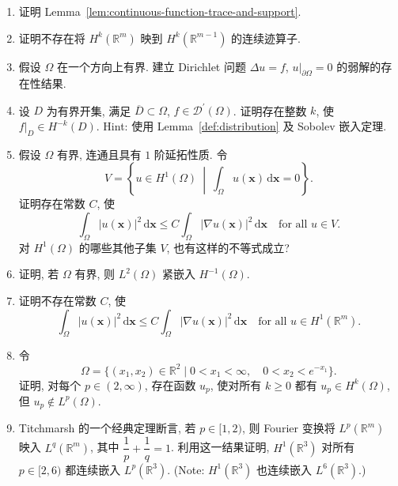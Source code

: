 \begin{enumerate}[label=\thesection.\arabic*.,ref=\thesection.\arabic*,start=1,series=book-problems]
\item\label{ex:continuous-function-trace-support-lemma-proof} 证明 Lemma~\ref{lem:continuous-function-trace-and-support}.

\item\label{ex:trace-without-half-order-loss-impossible} 证明不存在将 $H^k(\mathbb{R}^m)$ 映到 $H^k(\mathbb{R}^{m-1})$ 的连续迹算子.

\item\label{ex:one-direction-bounded-domain-weak-dirichlet-existence} 假设 $\Omega$ 在一个方向上有界. 建立 Dirichlet 问题 $\Delta u=f$, $u|_{\partial\Omega}=0$ 的弱解的存在性结果.

\item\label{ex:distribution-local-negative-sobolev-order} 设 $D$ 为有界开集, 满足 $\overline D\subset\Omega$, $f\in\mathcal{D}^{\prime}(\Omega)$. 证明存在整数 $k$, 使 $f|_D\in H^{-k}(D)$. Hint: 使用 Lemma~\ref{def:distribution} 及 Sobolev 嵌入定理.

\item\label{ex:mean-zero-sobolev-poincare-inequality} 假设 $\Omega$ 有界, 连通且具有 $1$ 阶延拓性质. 令\[V=\left\{u\in H^1(\Omega)\ \middle|\ \int_{\Omega}u(\bm{x})\,\mathrm{d}\bm{x}=0\right\}.\]证明存在常数 $C$, 使\[\int_{\Omega}|u(\bm{x})|^2\,\mathrm{d}\bm{x}\leq C\int_{\Omega}|\nabla u(\bm{x})|^2\,\mathrm{d}\bm{x}\quad\text{for all }u\in V.\]对 $H^1(\Omega)$ 的哪些其他子集 $V$, 也有这样的不等式成立?

\item\label{ex:l-two-into-negative-one-compact-embedding} 证明, 若 $\Omega$ 有界, 则 $L^2(\Omega)$ 紧嵌入 $H^{-1}(\Omega)$.

\item\label{ex:whole-space-poincare-no-uniform-constant} 证明不存在常数 $C$, 使\[\int_{\Omega}|u(\bm{x})|^2\,\mathrm{d}\bm{x}\leq C\int_{\Omega}|\nabla u(\bm{x})|^2\,\mathrm{d}\bm{x}\quad\text{for all }u\in H^1(\mathbb{R}^m).\]

\item\label{ex:narrow-unbounded-domain-smooth-not-l-p-example} 令\[\Omega=\{(x_1,x_2)\in\mathbb{R}^2\mid0<x_1<\infty,\quad0<x_2<e^{-x_1}\}.\]证明, 对每个 $p\in(2,\infty)$, 存在函数 $u_p$, 使对所有 $k\geq0$ 都有 $u_p\in H^k(\Omega)$, 但 $u_p\notin L^p(\Omega)$.

\item\label{ex:titchmarsh-fourier-l-p-sobolev-embedding} Titchmarsh 的一个经典定理断言, 若 $p\in[1,2)$, 则 Fourier 变换将 $L^p(\mathbb{R}^m)$ 映入 $L^q(\mathbb{R}^m)$, 其中 $\dfrac{1}{p}+\dfrac{1}{q}=1$. 利用这一结果证明, $H^1(\mathbb{R}^3)$ 对所有 $p\in[2,6)$ 都连续嵌入 $L^p(\mathbb{R}^3)$. (Note: $H^1(\mathbb{R}^3)$ 也连续嵌入 $L^6(\mathbb{R}^3)$.)


\end{enumerate}
